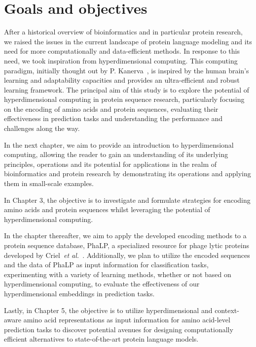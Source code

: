 \section{Goals and objectives}
After a historical overview of bioinformatics and in particular protein research, we raised the issues in the current landscape of protein language modeling and its need for more computationally and data-efficient methods. In response to this need, we took inspiration from hyperdimensional computing. This computing paradigm, initially thought out by P. Kanerva~\cite{Kanerva2009}, is inspired by the human brain's learning and adaptability capacities and provides an ultra-efficient and robust learning framework. The principal aim of this study is to explore the potential of hyperdimensional computing in protein sequence research, particularly focusing on the encoding of amino acids and protein sequences, evaluating their effectiveness in prediction tasks and understanding the performance and challenges along the way.

In the next chapter, we aim to provide an introduction to hyperdimensional computing, allowing the reader to gain an understanding of its underlying principles, operations and its potential for applications in the realm of bioinformatics and protein research by demonstrating its operations and applying them in small-scale examples.

In Chapter 3, the objective is to investigate and formulate strategies for encoding amino acids and protein sequences whilst leveraging the potential of hyperdimensional computing.

In the chapter thereafter, we aim to apply the developed encoding methods to a protein sequence database, PhaLP, a specialized resource for phage lytic proteins developed by Criel~\textit{et al.}~\cite{phalp}. Additionally, we plan to utilize the encoded sequences and the data of PhaLP as input information for classification tasks, experimenting with a variety of learning methods, whether or not based on hyperdimensional computing, to evaluate the effectiveness of our hyperdimensional embeddings in prediction tasks.

Lastly, in Chapter 5, the objective is to utilize hyperdimensional and context-aware amino acid representations as input information for amino acid-level prediction tasks to discover potential avenues for designing computationally efficient alternatives to state-of-the-art protein language models.